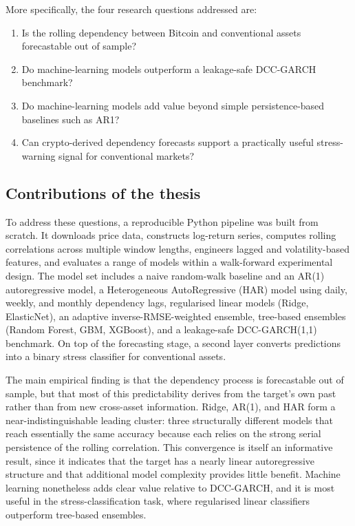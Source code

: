 More specifically, the four research questions addressed are:

\begin{enumerate}
    \item Is the rolling dependency between Bitcoin and conventional assets forecastable out of sample?
    \item Do machine-learning models outperform a leakage-safe DCC-GARCH benchmark?
    \item Do machine-learning models add value beyond simple persistence-based baselines such as AR1?
    \item Can crypto-derived dependency forecasts support a practically useful stress-warning signal for conventional markets?
\end{enumerate}

\subsection{Contributions of the thesis}

To address these questions, a reproducible Python pipeline was built from scratch. It downloads price data, constructs log-return series, computes rolling correlations across multiple window lengths, engineers lagged and volatility-based features, and evaluates a range of models within a walk-forward experimental design. The model set includes a naive random-walk baseline and an AR(1) autoregressive model, a Heterogeneous AutoRegressive (HAR) model using daily, weekly, and monthly dependency lags, regularised linear models (Ridge, ElasticNet), an adaptive inverse-RMSE-weighted ensemble, tree-based ensembles (Random Forest, GBM, XGBoost), and a leakage-safe DCC-GARCH(1,1) benchmark. On top of the forecasting stage, a second layer converts predictions into a binary stress classifier for conventional assets.

The main empirical finding is that the dependency process is forecastable out of sample, but that most of this predictability derives from the target's own past rather than from new cross-asset information. Ridge, AR(1), and HAR form a near-indistinguishable leading cluster: three structurally different models that reach essentially the same accuracy because each relies on the strong serial persistence of the rolling correlation. This convergence is itself an informative result, since it indicates that the target has a nearly linear autoregressive structure and that additional model complexity provides little benefit. Machine learning nonetheless adds clear value relative to DCC-GARCH, and it is most useful in the stress-classification task, where regularised linear classifiers outperform tree-based ensembles.

